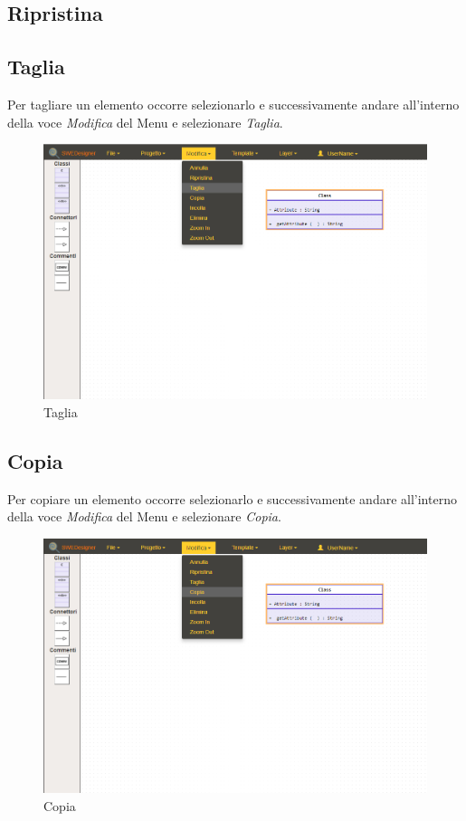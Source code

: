 \subsection{Ripristina}

\subsection{Taglia}
Per tagliare un elemento occorre selezionarlo e successivamente andare all'interno della voce \textit{Modifica} del Menu e selezionare \textit{Taglia}.\\
\begin{figure}[H]
	\centering
		\includegraphics[width=1\linewidth]{res/img/taglia.png}
	\caption{Taglia}
\end{figure}
\newpage

\subsection{Copia}
Per copiare un elemento occorre selezionarlo e successivamente andare all'interno della voce \textit{Modifica} del Menu e selezionare \textit{Copia}.\\
\begin{figure}[H]
	\centering
		\includegraphics[width=1\linewidth]{res/img/copia.png}
	\caption{Copia}
\end{figure}
\newpage

